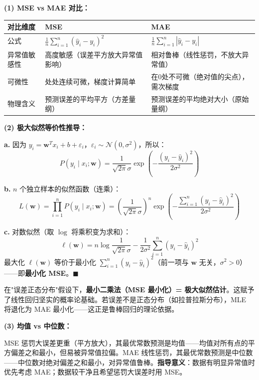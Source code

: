 \documentclass[a4paper,11pt]{ctexart}
\begin{document}
\begin{solutionbox}[参考答案与详细解析]
    \textbf{(1) MSE vs MAE 对比：}
    \begin{center}
    \begin{tabular}{p{3cm} p{4.5cm} p{4.5cm}}
        \toprule
        对比维度 & MSE & MAE \\
        \midrule
        公式 & $\frac{1}{n}\sum_{i=1}^n(\hat{y}_i-y_i)^2$ & $\frac{1}{n}\sum_{i=1}^n|\hat{y}_i-y_i|$ \\[0.8em]
        异常值敏感性 & 高度敏感（误差平方放大异常值影响） & 相对鲁棒（线性惩罚，不放大异常值） \\[0.8em]
        可微性 & 处处连续可微，梯度计算简单 & 在0处不可微（绝对值的尖点），需次梯度 \\[0.8em]
        物理含义 & 预测误差的平均平方（方差量纲） & 预测误差的平均绝对大小（原始量纲） \\
        \bottomrule
    \end{tabular}
    \end{center}

    \textbf{(2) 极大似然等价性推导：}

    \textbf{a.} 因为 $y_i = \boldsymbol{w}^T x_i + b + \varepsilon_i$，$\varepsilon_i\sim\mathcal{N}(0,\sigma^2)$，所以：
    \[
    P(y_i\mid x_i;\boldsymbol{w}) = \frac{1}{\sqrt{2\pi}\sigma}\exp\!\left(-\frac{(y_i - \hat{y}_i)^2}{2\sigma^2}\right)
    \]

    \textbf{b.} $n$ 个独立样本的似然函数（连乘）：
    \[
    L(\boldsymbol{w}) = \prod_{i=1}^n P(y_i\mid x_i;\boldsymbol{w}) = \left(\frac{1}{\sqrt{2\pi}\sigma}\right)^n \exp\!\left(-\frac{\sum_{i=1}^n(y_i-\hat{y}_i)^2}{2\sigma^2}\right)
    \]

    \textbf{c.} 对数似然（取 $\log$ 将乘积变为求和）：
    \[
    \ell(\boldsymbol{w}) = n\log\frac{1}{\sqrt{2\pi}\sigma} - \frac{1}{2\sigma^2}\sum_{i=1}^n(y_i-\hat{y}_i)^2
    \]
    最大化 $\ell(\boldsymbol{w})$ 等价于最小化 $\sum_{i=1}^n(y_i-\hat{y}_i)^2$（前一项与 $\boldsymbol{w}$ 无关，$\sigma^2>0$）——即\textbf{最小化 MSE}。$\blacksquare$

    \begin{keybox}[等价性的深刻含义]
        在"误差正态分布"假设下，\textbf{最小二乘法（MSE 最小化）= 极大似然估计}。这赋予了线性回归坚实的概率论基础。若误差不是正态分布（如拉普拉斯分布），MLE 将退化为 MAE 最小化——这正是鲁棒回归的理论依据。
    \end{keybox}

    \textbf{(3) 均值 vs 中位数：}

    MSE 惩罚大误差更重（平方放大），其最优常数预测是均值——均值对所有点的平方偏差之和最小，但易被异常值拉偏。MAE 线性惩罚，其最优常数预测是中位数——中位数对绝对偏差之和最小，对异常值鲁棒。\textbf{指导意义}：数据有明显异常值时优先考虑 MAE；数据较干净且希望惩罚大误差时用 MSE。
\end{solutionbox}
\end{document}
